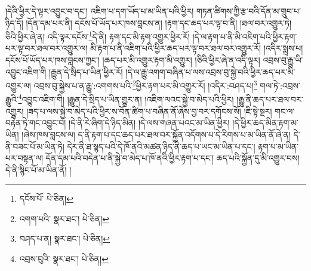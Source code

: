 །དེའི་ཕྱིར་དེ་ལྟར་འབྱུང་བ་དང་། འཇིག་པ་དག་ཡོད་པ་མ་ཡིན་པའི་ཕྱིར། གཏན་ཚིགས་ཀྱི་རྩ་བའི་དོན་མ་གྲུབ་པ་ཉིད་དོ། །དོན་དམ་པར་ནི། དངོས་པོ་ཡོད་པར་ཁས་བླངས་ན། །རྟག་དང་ཆད་པར་ལྟ་བ་ནི། །ཐལ་བར་འགྱུར་ཏེ། ཅིའི་ཕྱིར་ཞེ་ན། འདི་ལྟར་དངོས་\footnote{དངོས་པོ་  པེ་ཅིན། }དེ་ནི། རྟག་དང་མི་རྟག་འགྱུར་ཕྱིར་རོ། །དེ་ལ་རྟག་པ་ནི་མི་འཇིག་པའི་ཕྱིར་རྟག་པར་ལྟ་བར་ཐལ་བར་འགྱུར་ལ། མི་རྟག་པ་ནི་འཇིག་པའི་ཕྱིར་ཆད་པར་ལྟ་བར་ཐལ་བར་འགྱུར་རོ། །འདིར་སྨྲས་པ། དངོས་པོ་ཡོད་པར་ཁས་བླངས་ཀྱང་། །ཆད་པར་མི་འགྱུར་རྟག་མི་འགྱུར། །ཅིའི་ཕྱིར་ཞེ་ན་འདི་ལྟར། འབྲས་བུ་རྒྱུ་ཡི་འབྱུང་འཇིག་གི །རྒྱུན་དེ་སྲིད་པ་ཡིན་ཕྱིར་རོ། །དེ་ལ་རྒྱུ་འགག་བཞིན་པ་ལས་འབྲས་བུ་སྐྱེ་བའི་ཕྱིར་ཆད་པར་མི་འགྱུར་ལ། འབྲས་བུ་སྐྱེས་པ་ན་རྒྱུ་:འགགས་པའི་\footnote{འགག་པའི་  སྣར་ཐང་།  པེ་ཅིན། }ཕྱིར་རྟག་པར་མི་འགྱུར་རོ། །འདིར་:བཤད་པ།\footnote{བཤད་པ་ན།  སྣར་ཐང་།  པེ་ཅིན། } གལ་ཏེ་:འབྲས་རྒྱུའི་\footnote{འབྲས་བུའི་  སྣར་ཐང་།  པེ་ཅིན། }འབྱུང་འཇིག་གི། །རྒྱུན་དེ་སྲིད་པ་ཡིན་གྱུར་ན། །འཇིག་ལའང་སྐྱེ་བ་མེད་པའི་ཕྱིར། །རྒྱུ་ནི་ཆད་པར་ཐལ་བར་འགྱུར། །ཟད་པ་ལས་སྐྱེ་བ་མེད་པའི་ཕྱིར་ས་བོན་ཚིག་པ་བཞིན་ནོ་ཞེས་བྱ་བར་དགོངས་སོ། །ཇི་སྟེ་སྔར། གང་ལ་བརྟེན་ཏེ་གང་འབྱུང་བ། །དེ་ནི་རེ་ཞིག་དེ་ཉིད་མིན། །དེ་ལས་གཞན་པའང་མ་ཡིན་ཕྱིར། །དེ་ཕྱིར་ཆད་མིན་རྟག་མ་ཡིན། །ཞེས་ཁས་བླངས་ལ། ད་ནི་རྟག་པ་དང་ཆད་པར་ཐལ་བར་སྐྱོན་འདོགས་པ་དེ་རིགས་པ་མ་ཡིན་ནོ་ཞེ་ན། དེ་ནི་བཟང་པོ་མ་ཡིན་ཏེ། དེར་ནི་ཐ་སྙད་པའི་དེ་ཁོ་ནའི་མཚན་ཉིད་ནི་ཆད་པ་ཡང་མ་ཡིན་པ་དང་། རྟག་པ་མ་ཡིན་པར་བསྟན་ལ། དོན་དམ་པའི་བདེན་པ་ནི་སྐྱེ་བ་མེད་པ་ཁོ་ནའི་ཕྱིར་རྟག་པ་དང་། ཆད་པའི་སྐྱོན་དུ་མི་འགྱུར་བས། དེ་ནི་སྙིང་པོ་མ་ཡིན་ནོ། །
